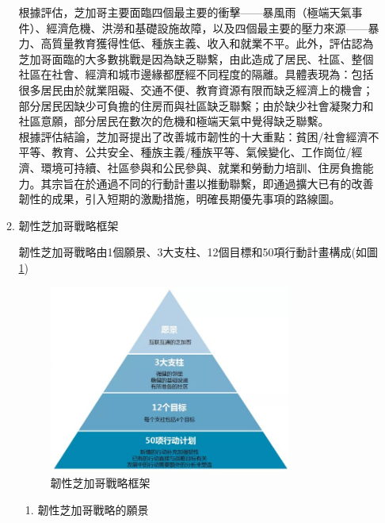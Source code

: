 \documentclass[a4paper,12pt]{article}
\begin{document}
\begin{enumerate}
\begin{enumerate}
根據評估，芝加哥主要面臨四個最主要的衝擊——暴風雨（極端天氣事件）、經濟危機、洪澇和基礎設施故障，以及四個最主要的壓力來源——暴力、高質量教育獲得性低、種族主義、收入和就業不平。此外，評估認為芝加哥面臨的大多數挑戰是因為缺乏聯繫，由此造成了居民、社區、整個社區在社會、經濟和城市邊緣都歷經不同程度的隔離。具體表現為：包括很多居民由於就業阻礙、交通不便、教育資源有限而缺乏經濟上的機會；部分居民因缺少可負擔的住房而與社區缺乏聯繫；由於缺少社會凝聚力和社區意願，部分居民在數次的危機和極端天氣中覺得缺乏聯繫。\\

根據評估結論，芝加哥提出了改善城市韌性的十大重點：貧困/社會經濟不平等、教育、公共安全、種族主義/種族平等、氣候變化、工作崗位/經濟、環境可持續、社區參與和公民參與、就業和勞動力培訓、住房負擔能力。其宗旨在於通過不同的行動計畫以推動聯繫，即通過擴大已有的改善韌性的成果，引入短期的激勵措施，明確長期優先事項的路線圖。\\

\item 韌性芝加哥戰略框架
\label{sec:orgda5622a}

韌性芝加哥戰略由1個願景、3大支柱、12個目標和50項行動計畫構成(如圖\ref{fig:Chicago-1})\\

\begin{figure}[htbp]
\centering
\includegraphics[width=300]{images/2021-03-24_15-12-51.jpg}
\caption{\label{fig:Chicago-1}韌性芝加哥戰略框架}
\end{figure}

\begin{enumerate}
\item 韌性芝加哥戰略的願景
\label{sec:orgd5ff8bf}


\end{enumerate}
\end{enumerate}
\end{enumerate}
\end{document}
